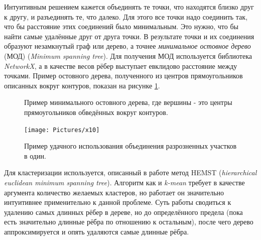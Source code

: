 \documentclass[12pt]{report}
\begin{document}
Интуитивным решением кажется объединять те точки, что находятся близко друг к другу, и разъединять те, что далеко. 
Для этого все точки надо соединить так, что бы   расстояние этих соединений было минимальным. Это нужно, что бы 
найти 
самые удалённые друг от друга точки. В результате точки и их соединения образуют незамкнутый граф или дерево, а 
точнее \emph{минимальное остовное дерево}  (МОД) (\textit{Minimum spanning tree}). Для получения МОД используется 
библиотека \textit{NetworkX}, а в качестве весов рёбер выступает евклидово расстояние между точками. Пример 
остовного 
дерева, полученного из центров прямоугольников описанных вокруг контуров, показан на рисунке \ref{fig:mst}.

\begin{figure}[h]
	\centering
	\caption{Пример минимального остовного дерева, где вершины - это центры прямоугольников обведённых вокруг 
контуров.}
	\label{fig:mst}
\end{figure}

\begin{figure}[h]
	\centering
	\texttt{[image: Pictures/x10]}
	\caption{Пример удачного использования объединения разрозненных участков в один.}
	\label{fig:cluster_example}
\end{figure}

Для кластеризации используется, описанный в работе \citep{grygorash2006minimum} метод HEMST (\textit{hierarchical 
euclidean minimum spanning tree}). Алгоритм как и \textit{k-mean} требует в качестве аргумента количество желаемых 
кластеров, но работает он значительно интуитивнее применительно к данной проблеме. Суть работы сводиться к удалению 
самых длинных рёбер в дереве, но до определённого предела (пока есть значительно длинные рёбра по отношению к 
остальным), после чего дерево аппроксимируется и опять удаляются самые длинные рёбра.
\end{document}
